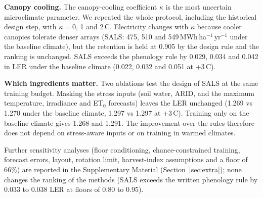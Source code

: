 \textbf{Canopy cooling.} The canopy-cooling coefficient $\kappa$ is the most uncertain microclimate parameter. We repeated the whole protocol, including the historical design step, with $\kappa=0$, 1 and 2\,\textdegree C. Electricity changes with $\kappa$ because cooler canopies tolerate denser arrays (SALS: 475, 510 and 549\,MWh\,ha$^{-1}$\,yr$^{-1}$ under the baseline climate), but the retention is held at 0.905 by the design rule and the ranking is unchanged. SALS exceeds the phenology rule by 0.029, 0.034 and 0.042 in LER under the baseline climate (0.022, 0.032 and 0.051 at +3\,\textdegree C).

\textbf{Which ingredients matter.} Two ablations test the design of SALS at the same training budget. Masking the stress inputs (soil water, ARID, and the maximum temperature, irradiance and ET$_0$ forecasts) leaves the LER unchanged (1.269 vs 1.270 under the baseline climate, 1.297 vs 1.297 at +3\,\textdegree C). Training only on the baseline climate gives 1.268 and 1.291. The improvement over the rules therefore does not depend on stress-aware inputs or on training in warmed climates.

Further sensitivity analyses (floor conditioning, chance-constrained training, forecast errors, layout, rotation limit, harvest-index assumptions and a floor of 66\%) are reported in the Supplementary Material (Section~\ref{sec:extra}); none changes the ranking of the methods (SALS exceeds the written phenology rule by 0.033 to 0.038 LER at floors of 0.80 to 0.95).

